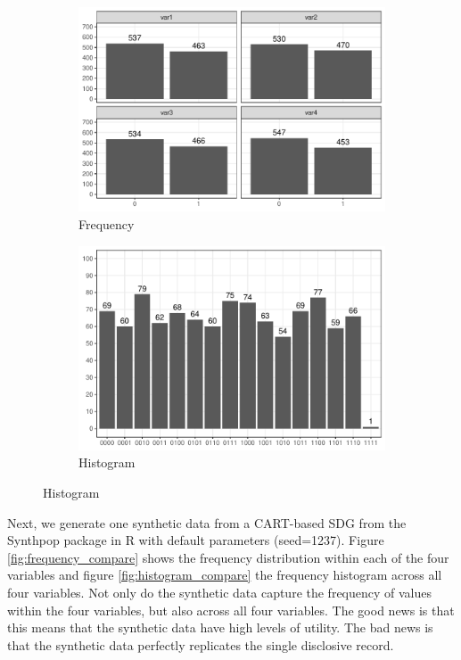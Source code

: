 \documentclass[runningheads]{llncs}
\begin{document}
\begin{figure}[!h]
    \centering
    \caption{Original data}
    \begin{subfigure}{0.48\textwidth}
        \includegraphics[width=\textwidth]{../graphs/graph_cart_frequency.pdf}
        \caption{Frequency}
        \label{fig:frequency}
    \end{subfigure}
    \hfill
    \begin{subfigure}{0.48\textwidth}
        \includegraphics[width=\textwidth]{../graphs/graph_cart_histogram.pdf}
        \caption{Histogram}
        \label{fig:histogram}
    \end{subfigure}
    \label{fig:original}
\end{figure}

Next, we generate one synthetic data from a CART-based SDG from the Synthpop package in R with default parameters (seed=1237).  Figure \ref{fig:frequency_compare} shows the frequency distribution within each of the four variables and figure \ref{fig:histogram_compare} the frequency histogram across all four variables.  Not only do the synthetic data capture the frequency of values within the four variables, but also across all four variables.  The good news is that this means that the synthetic data have high levels of utility.  The bad news is that the synthetic data perfectly replicates the single disclosive record.
\end{document}
